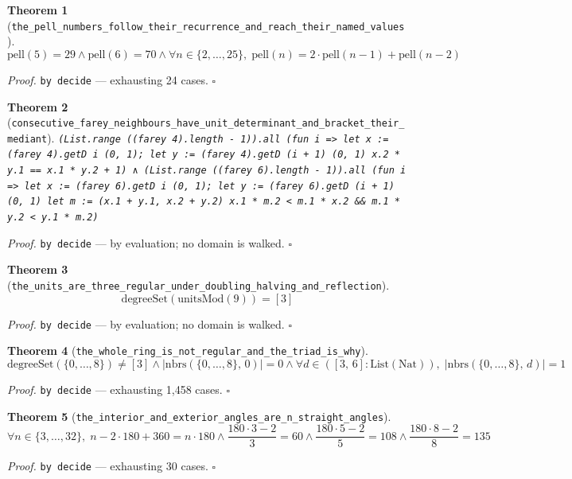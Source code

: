 \documentclass[11pt]{article}
\newtheorem{theorem}{Theorem}[section]
\begin{document}
\begin{theorem}[\texttt{the\_pell\_numbers\_follow\_their\_recurrence\_and\_reach\_their\_named\_values}]
\[ \mathrm{pell}\mathopen{}\left(5\right) = 29 \land \mathrm{pell}\mathopen{}\left(6\right) = 70 \land \forall n \in \{2,\dots,25\},\; \mathrm{pell}\mathopen{}\left(n\right) = 2 \cdot \mathrm{pell}\mathopen{}\left(n - 1\right) + \mathrm{pell}\mathopen{}\left(n - 2\right) \]
\end{theorem}
\noindent\emph{Proof.} \texttt{by decide} --- exhausting 24 cases. \hfill$\square$

\begin{theorem}[\texttt{consecutive\_farey\_neighbours\_have\_unit\_determinant\_and\_bracket\_their\_mediant}]
\texttt{(List.range ((farey 4).length - 1)).all (fun i => let x := (farey 4).getD i (0, 1); let y := (farey 4).getD (i + 1) (0, 1) x.2 * y.1 == x.1 * y.2 + 1) ∧ (List.range ((farey 6).length - 1)).all (fun i => let x := (farey 6).getD i (0, 1); let y := (farey 6).getD (i + 1) (0, 1) let m := (x.1 + y.1, x.2 + y.2) x.1 * m.2 < m.1 * x.2 \&\& m.1 * y.2 < y.1 * m.2)}
\end{theorem}
\noindent\emph{Proof.} \texttt{by decide} --- by evaluation; no domain is walked. \hfill$\square$

\begin{theorem}[\texttt{the\_units\_are\_three\_regular\_under\_doubling\_halving\_and\_reflection}]
\[ \mathrm{degreeSet}\mathopen{}\left(\mathrm{unitsMod}\mathopen{}\left(9\right)\right) = [3] \]
\end{theorem}
\noindent\emph{Proof.} \texttt{by decide} --- by evaluation; no domain is walked. \hfill$\square$

\begin{theorem}[\texttt{the\_whole\_ring\_is\_not\_regular\_and\_the\_triad\_is\_why}]
\[ \mathrm{degreeSet}\mathopen{}\left(\{0,\dots,8\}\right) \neq [3] \land \left|\mathrm{nbrs}\mathopen{}\left(\{0,\dots,8\},\,0\right)\right| = 0 \land \forall d \in \left([3,\,6] : \mathrm{List}\mathopen{}\left(\mathrm{Nat}\right)\right),\; \left|\mathrm{nbrs}\mathopen{}\left(\{0,\dots,8\},\,d\right)\right| = 1 \]
\end{theorem}
\noindent\emph{Proof.} \texttt{by decide} --- exhausting 1,458 cases. \hfill$\square$

\begin{theorem}[\texttt{the\_interior\_and\_exterior\_angles\_are\_n\_straight\_angles}]
\[ \forall n \in \{3,\dots,32\},\; n - 2 \cdot 180 + 360 = n \cdot 180 \land \frac{180 \cdot 3 - 2}{3} = 60 \land \frac{180 \cdot 5 - 2}{5} = 108 \land \frac{180 \cdot 8 - 2}{8} = 135 \]
\end{theorem}
\noindent\emph{Proof.} \texttt{by decide} --- exhausting 30 cases. \hfill$\square$
\end{document}
